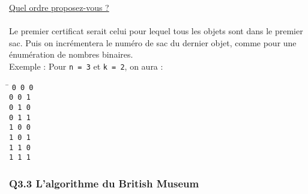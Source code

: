 \underline{Quel ordre proposez-vous ?}
~\\~\\
Le premier certificat serait celui pour lequel tous les objets sont dans le premier sac. Puis on incrémentera le numéro de sac du dernier objet, comme pour une énumération de nombres binaires.\\
Exemple : Pour \verb+n = 3+ et \verb+k = 2+, on aura :
\begin{tabbing}
	\hspace{1cm}\=\kill
	\>	\verb+0 0 0+\\
	\>	\verb+0 0 1+\\
	\>	\verb+0 1 0+\\
	\>	\verb+0 1 1+\\
	\>	\verb+1 0 0+\\
	\>	\verb+1 0 1+\\
	\>	\verb+1 1 0+\\
	\>	\verb+1 1 1+
\end{tabbing}

\subsubsection{Q3.3 L'algorithme du British Museum}

